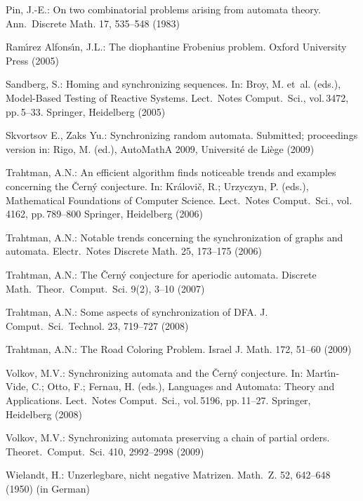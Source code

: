 \documentclass[11pt]{llncs}
\begin{document}
\begin{thebibliography}{99}
Pin, J.-E.: On two combinatorial problems arising from automata
theory. Ann.\ Discrete Math. 17, 535--548 (1983)

Ram\'{\i}rez Alfons\'{\i}n, J.L.: The diophantine Frobenius problem.
Oxford University Press (2005)

Sandberg, S.: Homing and synchronizing sequences. In: Broy, M.
et~al. (eds.), Model-Based Testing of Reactive Systems. Lect.\
Notes Comput.\ Sci., vol.\,3472, pp.\,5--33. Springer, Heidelberg
(2005)

Skvortsov E., Zaks Yu.: Synchronizing random automata. Submitted;
proceedings version in: Rigo, M. (ed.), AutoMathA 2009, Universit\'e
de Li\`ege (2009)

Trahtman, A.N.: An efficient algorithm finds noticeable trends
and examples concerning the \v{C}ern\'y conjecture. In:
Kr\'alovi\v{c}, R.; Urzyczyn, P. (eds.), Mathematical Foundations
of Computer Science. Lect.\ Notes Comput.\ Sci., vol.\,4162, pp.\,789--800
Springer, Heidelberg (2006)

Trahtman, A.N.: Notable trends concerning the synchronization
of graphs and automata. Electr.\ Notes Discrete Math. 25, 173--175 (2006)

Trahtman, A.N.: The \v{C}ern\'y conjecture for aperiodic automata.
Discrete Math.\ Theor.\ Comput.\ Sci. 9(2), 3--10 (2007)

Trahtman, A.N.: Some aspects of synchronization of DFA. J. Comput.\ Sci.\
Technol. 23, 719--727 (2008)

Trahtman, A.N.: The Road Coloring Problem. Israel J. Math. 172,
51--60 (2009)

Volkov, M.V.: Synchronizing automata and the \v{C}ern\'{y}
conjecture. In: Mart\'\i{}n-Vide, C.; Otto, F.; Fernau, H. (eds.),
Languages and Automata: Theory and Applications. Lect.\ Notes
Comput.\ Sci., vol.\,5196, pp.\,11--27.  Springer, Heidelberg (2008)

\bibitem{Vo09}
Volkov, M.V.: Synchronizing automata preserving a chain of partial
orders. Theoret.\ Comput.\ Sci. 410, 2992--2998 (2009)

Wielandt, H.: Unzerlegbare, nicht negative Matrizen. Math.\ Z.
52, 642--648 (1950) (in German)
\end{thebibliography}
\end{document}
